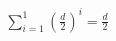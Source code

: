 \documentclass[preview]{standalone}
\begin{document}
\begin{align*}
\sum_{i=1}^{1} \left(\frac{d}{2}\right)^i =\frac{d}{2}
\end{align*}
\end{document}
